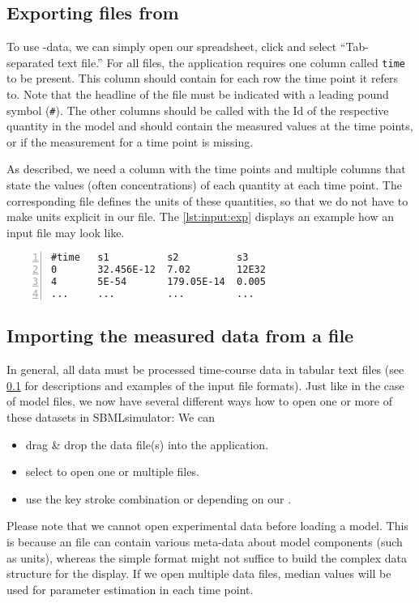 \subsection{Exporting \CSV files from \Excel}
\label{sec:CSVformat}

To use \Excel-data, we can simply open our \Excel spreadsheet, click  and select ``Tab-separated text file.''
For all files, the application requires one column called \texttt{time} to be present.
This column should contain for each row the time point it refers to.
Note that the headline of the file must be indicated with a leading pound symbol (\texttt{\#}).
The other columns should be called with the \ac{Id} of the respective quantity in the model and should contain the measured values at the time points, or \NaN if the measurement for a time point is missing. 

As described, we need a column with the time points and multiple columns that state the values (often concentrations) of each quantity at each time point.
The corresponding \SBML file defines the units of these quantities, so that we do not have to make units explicit in our \CSV file.
The \cref{lst:input:exp} displays an example how an input file may look like.
\begin{lstlisting}[caption={Input file example for experimental data},label={lst:input:exp},numbers=left,captionpos=t,float=h]
#time   s1          s2          s3
0       32.456E-12  7.02        12E32
4       5E-54       179.05E-14  0.005
...     ...         ...         ...
\end{lstlisting}

\subsection{Importing the measured data from a file}
\label{sec:opendata}

In general, all data must be processed time-course data in tabular text files (see \cref{sec:CSVformat} for descriptions and examples of the input file formats).
Just like in the case of model files, we now have several different ways how to open one or more of these datasets in SBMLsimulator: We can
\begin{itemize}
  \item drag \& drop the data file(s) into the application.
  \item select  to open one or multiple files.
  \item use the key stroke combination  or  depending on our \OS.
\end{itemize}
Please note that we cannot open experimental data before loading a model.
This is because an \SBML file can contain various meta-data about model components (such as units), whereas the simple \CSV format might not suffice to build the complex data structure for the display.
If we open multiple data files, median values will be used for parameter estimation in each time point.

